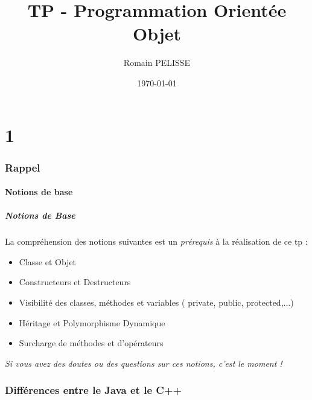 \documentclass[handout]{beamer}
\title{TP - Programmation Orientée Objet}
\author{Romain PELISSE}
\institute{ESME Sudria}
\date{\today}
\begin{document}

\frame{\titlepage}

\section[Outline]{}
\frame{\tableofcontents[part=1]}
\part{1}
\section{Rappel}
\subsection{Notions de base}
\begin{frame}
	\frametitle{Notions de Base}
	La compréhension des notions suivantes est un \emph{prérequis} {\`a} la réalisation de ce tp :
	\begin{itemize}
		\item<1-> Classe et Objet
		\item<2-> Constructeurs et Destructeurs
		\item<3-> Visibilité des classes, méthodes et variables ( private, public, protected,...)
		\item<4-> Héritage et Polymorphisme Dynamique
		\item<5-> Surcharge de méthodes et d'opérateurs
	\end{itemize}
	\textit<6->{Si vous avez des doutes ou des questions sur ces notions, c'est le moment !}
\end{frame}


\section{Différences entre le Java et le C++}
\end{document}
